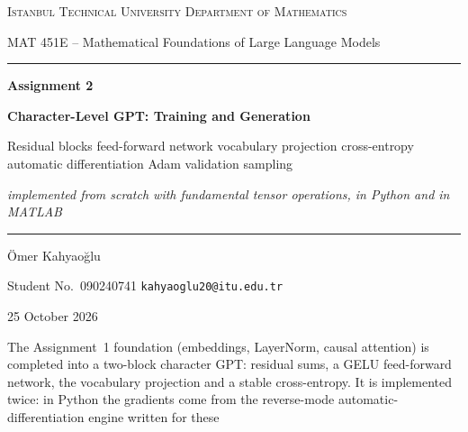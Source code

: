 \documentclass[11pt,a4paper]{article}
\numberwithin{equation}{section}
\begin{document}
\begin{titlepage}
\centering
\vspace*{0.4cm}
{\large\scshape Istanbul Technical University \textbullet{} Department of Mathematics\par}
\vspace{0.3cm}
{\large MAT 451E -- Mathematical Foundations of Large Language Models\par}
\vspace{0.8cm}
{\color{gray!60}\rule{0.42\linewidth}{0.6pt}\par}
\vspace{0.8cm}
{\Huge\bfseries Assignment 2\par}
\vspace{0.35cm}
{\LARGE\bfseries Character-Level GPT: Training and Generation\par}
\vspace{0.5cm}
{\large Residual blocks \textbullet{} feed-forward network \textbullet{} vocabulary projection \textbullet{} cross-entropy
\textbullet{} automatic differentiation \textbullet{} Adam \textbullet{} validation \textbullet{} sampling\par}
\vspace{0.4cm}
{\large\itshape implemented from scratch with fundamental tensor operations, in Python and in MATLAB\par}
\vspace{0.8cm}
{\color{gray!60}\rule{0.42\linewidth}{0.6pt}\par}
\vspace{0.8cm}
{\Large Ömer Kahyaoğlu\par}
\vspace{0.2cm}
{\large Student No.\ 090240741 \textbullet{} \texttt{kahyaoglu20@itu.edu.tr}\par}
\vspace{0.3cm}
{\large 25 October 2026\par}
\vspace{0.8cm}
\begin{tcolorbox}[width=0.86\linewidth,colback=gray!4,colframe=gray!50!black,boxrule=0.5pt,arc=2pt,
                  title={\bfseries Summary},fonttitle=\small]
\small
The Assignment~1 foundation (embeddings, LayerNorm, causal attention) is completed into a two-block character GPT:
residual sums, a GELU feed-forward network, the vocabulary projection and a stable cross-entropy. It is implemented
twice: in Python the gradients come from the reverse-mode automatic-differentiation engine written for these

\end{tcolorbox}
\end{titlepage}
\end{document}
